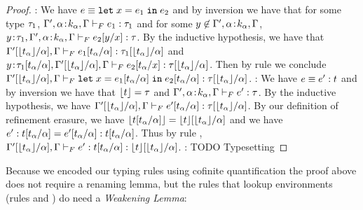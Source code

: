 \begin{proof}
\pfcase{\fLet}: We have $\sexpr \equiv \eletin{x}{\sexpr_1}{\sexpr_2}$
and by inversion we have that for some type $\sftype_1$,
$\hasftype{\tcenv', \bind{\al}{k_{\al}}, \tcenv}{\sexpr_1}{\sftype_1}$
and for some $\notmem{y}{\tcenv', \bind{\al}{k_{\al}}, \tcenv}$,
$\hasftype{\bind{y}{\sftype_1},\tcenv', \bind{\al}{k_{\al}}, \tcenv}
{\subst{\sexpr_2}{x}{y}}{\sftype}$.
By the inductive hypothesis, we have that
$\hasftype{\subst{\tcenv'}{\al}{\forgetreft{\stype_{\al}}}, \tcenv}
{\subst{\sexpr_1}{\tvar}{\stype_\tvar}}{\subst{\sftype_1}{\tvar}{\forgetreft{\stype_\tvar}}}$
and\\
$\hasftype{\bind{y}{\subst{\sftype_1}{\tvar}{\stype_\tvar}},\subst{\tcenv'}{\al}{\forgetreft{\stype_{\al}}}, \tcenv}
{\subst{\sexpr_2}{x}{\stype_\tvar}}{\subst{\sftype}{\tvar}{\forgetreft{\stype_\tvar}}}$.
Then by rule \fLet we conclude\\
$\hasftype{\subst{\tcenv'}{\al}{\forgetreft{\stype_{\al}}}, \tcenv}
{\eletin{x}{\subst{\sexpr_1}{\tvar}{\stype_\tvar}}{\subst{\sexpr_2}{\tvar}{\stype_\tvar}}}{\subst{\sftype}{\tvar}{\forgetreft{\stype_\tvar}}}$.
\pfcase{\fAnn}: We have $\sexpr \equiv \tyann{\sexpr'}{\stype}$ 
and by inversion we have that $\forgetreft{\stype} = \sftype$ and 
$\hasftype{\tcenv', \bind{\al}{k_{\al}}, \tcenv}
{\sexpr'}{\sftype}$.
By the inductive hypothesis, we have
$\hasftype{\subst{\tcenv'}{\al}{\forgetreft{\stype_{\al}}}, \tcenv}
{\subst{\sexpr'}{\tvar}{\stype_\tvar}}{\subst{\sftype}{\tvar}{\forgetreft{\stype_\tvar}}}$.
By our definition of refinement erasure, we have
$\forgetreft{\subst{\stype}{\tvar}{\stype_\tvar}}
 = \subst{\forgetreft{\stype}}{\tvar}{\forgetreft{\stype_\tvar}}$
and we have 
$\subst{\tyann{\sexpr'}{\stype}}{\tvar}{\stype_\tvar} 
 = \tyann{\subst{\sexpr'}{\tvar}{\stype_\tvar}}{\subst{\stype}{\tvar}{\stype_\tvar}}$. Thus by rule \fAnn,
$\hasftype{\subst{\tcenv'}{\al}{\forgetreft{\stype_{\al}}}, \tcenv}
{\subst{\tyann{\sexpr'}{\stype}}{\tvar}{\stype_\tvar}}{\subst{\forgetreft{\stype}}{\tvar}{\forgetreft{\stype_\tvar}}}$.
\pfcase{\fIf}: TODO Typesetting
\end{proof}  

Because we encoded our typing rules using 
cofinite quantification %
the proof above does not require a renaming lemma, but 
the rules that lookup environments 
(rules \tVar and \wtVar) do need a \emph{Weakening Lemma}:

